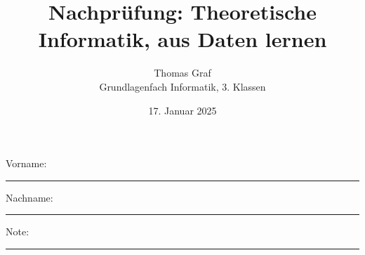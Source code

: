 \newtoggle{withbonus} \togglefalse{withbonus} %

\newcommand{\mycourse}{Grundlagenfach Informatik}
\newcommand{\myclass}{3. Klassen}
\newcommand{\mydate}{17. Januar 2025}

\title{\textbf{Nachprüfung: Theoretische Informatik, aus Daten lernen}}
\author{Thomas Graf\\
	\mycourse, \myclass}
\date{\mydate}
\maketitle
\thispagestyle{headandfoot}

\begin{center}
\end{center}
\vspace{10mm}

\begin{center}
	Vorname: \rule{45mm}{0.8pt}\qquad Nachname: \rule{45mm}{0.8pt}
\end{center}
\vspace{20mm}

\begin{center}
	\iftoggle{withbonus} {
		\combinedgradetable[h][questions]
	} {
		\gradetable[h][questions]
	}
\end{center}
\vspace{15mm}
\begin{center}
	Note:
	\vspace{10mm}

	\rule{8mm}{1.2pt}
\end{center}
\clearpage

